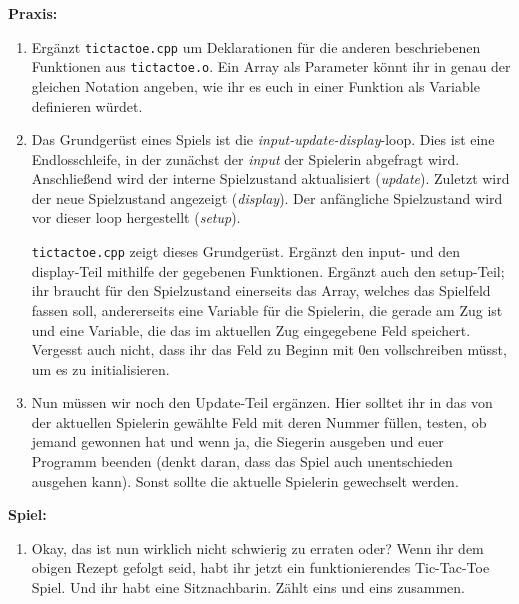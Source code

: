 \textbf{Praxis:}
\begin{enumerate}
    \item Ergänzt \texttt{tictactoe.cpp} um Deklarationen für die anderen
        beschriebenen Funktionen aus \texttt{tictactoe.o}. Ein Array als
        Parameter könnt ihr in genau der gleichen Notation angeben, wie ihr es
        euch in einer Funktion als Variable definieren würdet.
    \item Das Grundgerüst eines Spiels ist die \emph{input-update-display}-loop.
        Dies ist eine Endlosschleife, in der zunächst der \emph{input} der
        Spielerin abgefragt wird. Anschließend wird der interne Spielzustand
        aktualisiert (\emph{update}). Zuletzt wird der neue Spielzustand
        angezeigt (\emph{display}). Der anfängliche Spielzustand wird vor
        dieser loop hergestellt (\emph{setup}).

        \texttt{tictactoe.cpp} zeigt dieses Grundgerüst. Ergänzt den input- und
        den display-Teil mithilfe der gegebenen Funktionen. Ergänzt auch den
        setup-Teil; ihr braucht für den Spielzustand einerseits das Array,
        welches das Spielfeld fassen soll, andererseits eine Variable für die
        Spielerin, die gerade am Zug ist und eine Variable, die das im
        aktuellen Zug eingegebene Feld speichert. Vergesst auch nicht, dass ihr
        das Feld zu Beginn mit 0en vollschreiben müsst, um es zu
        initialisieren.
    \item Nun müssen wir noch den Update-Teil ergänzen. Hier solltet ihr in das
        von der aktuellen Spielerin gewählte Feld mit deren Nummer füllen,
        testen, ob jemand gewonnen hat und wenn ja, die Siegerin ausgeben und
        euer Programm beenden (denkt daran, dass das Spiel auch unentschieden
        ausgehen kann). Sonst sollte die aktuelle Spielerin gewechselt werden.
\end{enumerate}

\textbf{Spiel:}
\begin{enumerate}
    \item Okay, das ist nun wirklich nicht schwierig zu erraten oder? Wenn ihr
        dem obigen Rezept gefolgt seid, habt ihr jetzt ein funktionierendes
        Tic-Tac-Toe Spiel. Und ihr habt eine Sitznachbarin. Zählt eins und eins
        zusammen.
\end{enumerate}
